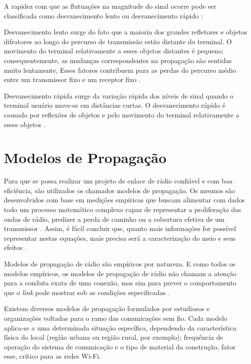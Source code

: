 A rapidez com que as flutuações na magnitude do sinal ocorre pode ser classificada como desvanecimento lento ou desvanecimento rápido \cite{haykin2009}:

\begin{citacao}
	Desvanecimento lento surge do fato que a maioria dos grandes refletores e objetos difratores ao longo do percurso de transmissão estão distante do terminal. O movimento do terminal relativamente a esses objetos distantes é pequeno; consequentemente, as mudanças correspondentes na propagação são sentidas muito lentamente, Esses fatores contribuem para as perdas do percurso médio entre um transmissor fixo e um receptor fixo \cite{haykin2009}.
	
	Desvanecimento rápida surge da variação rápida dos níveis de sinal quando o terminal usuário move-se em distâncias curtas. O desvanecimento rápido é causado por reflexões de objetos e pelo movimento do terminal relativamente a esses objetos \cite{haykin2009}.
\end{citacao}

\section{Modelos de Propagação}
\label{sec:modelos-propagacao}

Para que se possa realizar um projeto de enlace de rádio confiável e com boa eficiência, são utilizados os chamados modelos de propagação. Os mesmos são desenvolvidos com base em medições empíricas que buscam alimentar com dados todo um processo matemático complexo capaz de representar a proliferação das ondas de rádio, predizer a perda de caminho ou a cobertura efetiva de um transmissor \cite{akpaida2018,najnudel2004}. Assim, é fácil concluir que, quanto mais informações for possível representar nestas equações, mais precisa será a caracterização do meio e seus efeitos \cite{akpaida2018}.

Modelos de propagação de rádio são empíricos por natureza. E como todos os modelos empíricos, os modelos de propagação de rádio não chamam a atenção para a conduta exata de uma conexão, mas sim para prever o comportamento que o \textit{link} pode mostrar sob as condições especificadas \cite{akpaida2018}.

Existem diversos modelos de propagação formulados por estudiosos e organizações voltadas para o ramo das comunicações sem fio. Cada modelo aplica-se a uma determinada situação específica, dependendo da característica física do local (região urbana ou região rural, por exemplo); frequência de operação do sistema de comunicação e o tipo de material da construção, fator esse, crítico para as redes Wi-Fi.


